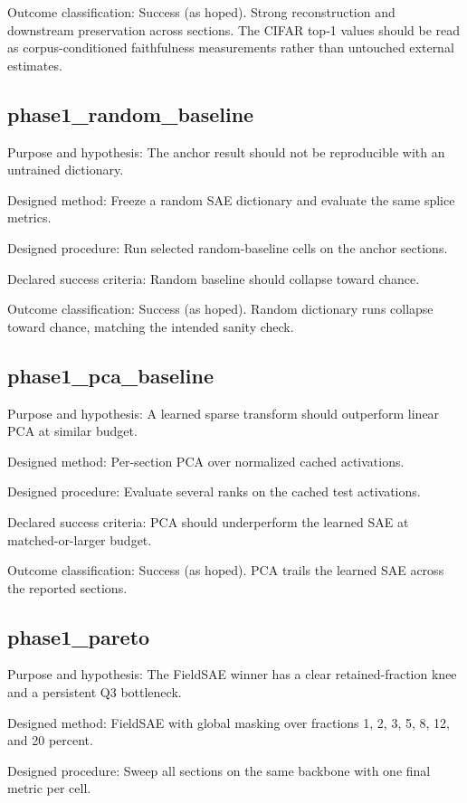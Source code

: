 \documentclass[11pt]{article}
\begin{document}
Outcome classification: Success (as hoped). Strong reconstruction and downstream preservation across sections. The CIFAR top-1 values should be read as corpus-conditioned faithfulness measurements rather than untouched external estimates.


\subsection{phase1\_random\_baseline}
Purpose and hypothesis: The anchor result should not be reproducible with an untrained dictionary.


Designed method: Freeze a random SAE dictionary and evaluate the same splice metrics.


Designed procedure: Run selected random-baseline cells on the anchor sections.


Declared success criteria: Random baseline should collapse toward chance.


Outcome classification: Success (as hoped). Random dictionary runs collapse toward chance, matching the intended sanity check.


\subsection{phase1\_pca\_baseline}
Purpose and hypothesis: A learned sparse transform should outperform linear PCA at similar budget.


Designed method: Per-section PCA over normalized cached activations.


Designed procedure: Evaluate several ranks on the cached test activations.


Declared success criteria: PCA should underperform the learned SAE at matched-or-larger budget.


Outcome classification: Success (as hoped). PCA trails the learned SAE across the reported sections.


\subsection{phase1\_pareto}
Purpose and hypothesis: The FieldSAE winner has a clear retained-fraction knee and a persistent Q3 bottleneck.


Designed method: FieldSAE with global masking over fractions 1, 2, 3, 5, 8, 12, and 20 percent.


Designed procedure: Sweep all sections on the same backbone with one final metric per cell.
\end{document}
